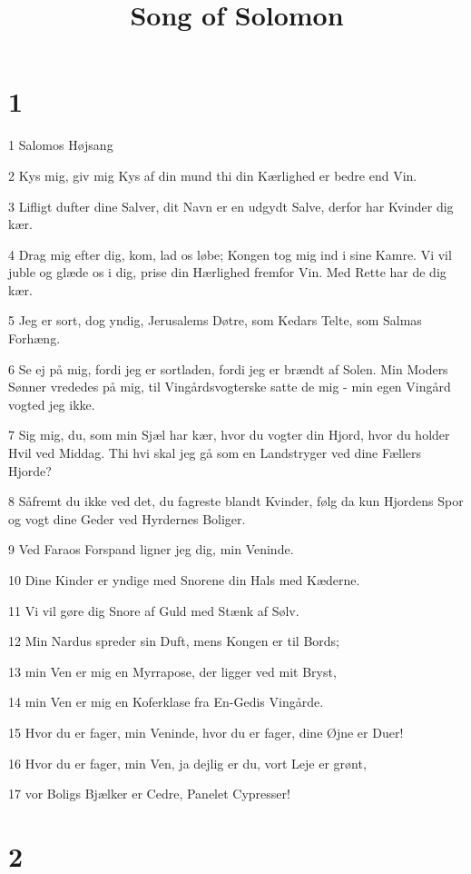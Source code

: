 

\title{Song of Solomon}


\chapter{1}

\par 1 Salomos Højsang
\par 2 Kys mig, giv mig Kys af din mund thi din Kærlighed er bedre end Vin.
\par 3 Lifligt dufter dine Salver, dit Navn er en udgydt Salve, derfor har Kvinder dig kær.
\par 4 Drag mig efter dig, kom, lad os løbe; Kongen tog mig ind i sine Kamre. Vi vil juble og glæde os i dig, prise din Hærlighed fremfor Vin. Med Rette har de dig kær.
\par 5 Jeg er sort, dog yndig, Jerusalems Døtre, som Kedars Telte, som Salmas Forhæng.
\par 6 Se ej på mig, fordi jeg er sortladen, fordi jeg er brændt af Solen. Min Moders Sønner vrededes på mig, til Vingårdsvogterske satte de mig - min egen Vingård vogted jeg ikke.
\par 7 Sig mig, du, som min Sjæl har kær, hvor du vogter din Hjord, hvor du holder Hvil ved Middag. Thi hvi skal jeg gå som en Landstryger ved dine Fællers Hjorde?
\par 8 Såfremt du ikke ved det, du fagreste blandt Kvinder, følg da kun Hjordens Spor og vogt dine Geder ved Hyrdernes Boliger.
\par 9 Ved Faraos Forspand ligner jeg dig, min Veninde.
\par 10 Dine Kinder er yndige med Snorene din Hals med Kæderne.
\par 11 Vi vil gøre dig Snore af Guld med Stænk af Sølv.
\par 12 Min Nardus spreder sin Duft, mens Kongen er til Bords;
\par 13 min Ven er mig en Myrrapose, der ligger ved mit Bryst,
\par 14 min Ven er mig en Koferklase fra En-Gedis Vingårde.
\par 15 Hvor du er fager, min Veninde, hvor du er fager, dine Øjne er Duer!
\par 16 Hvor du er fager, min Ven, ja dejlig er du, vort Leje er grønt,
\par 17 vor Boligs Bjælker er Cedre, Panelet Cypresser!

\chapter{2}

